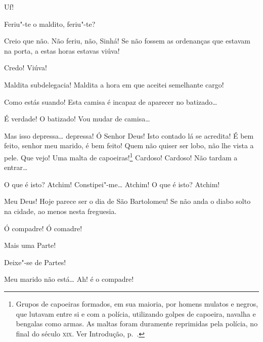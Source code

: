 \begin{linenumbers}
  Uf!

  Feriu"-te o maldito, feriu"-te?

 Creio que não.  Não feriu, não, Sinhá!
Se não fossem as ordenanças que estavam na
porta, a estas horas estavas viúva!

 Credo! Viúva!

 Maldita subdelegacia! Maldita a hora em que aceitei semelhante
cargo!

 Como estás suando! Esta camisa é incapaz de aparecer no
batizado\ldots{}

 É verdade! O batizado! Vou mudar de camisa\ldots{}

 Mas isso depressa\ldots{} depressa!  Ó Senhor Deus! Isto contado lá se acredita!
É bem feito, senhor meu marido, é bem feito! Quem não quiser ser
lobo, não lhe vista a pele.  Que vejo! Uma
malta de capoeiras!\footnote{ Grupos de capoeiras formados, em sua maioria, por homens
mulatos e negros, que lutavam entre si e com a polícia, utilizando golpes de
capoeira, navalha e bengalas como armas. As maltas foram duramente reprimidas
pela polícia, no final do século \textsc{xix}. Ver Introdução, p.~\pageref{capoeira}.} Cardoso! Cardoso! Não
tardam a entrar\ldots{}

  
O que é isto?  Atchim!
Constipei"-me\ldots{} Atchim! O que é isto? Atchim! 




 Meu Deus! Hoje parece ser o dia de São Bartolomeu! Se não anda
o diabo solto na cidade, ao menos
nesta freguesia.

 
Ó compadre! Ó comadre!

 Mais uma Parte!

 Deixe"-se de Partes!

 Meu marido não está\ldots{}  Ah! é o compadre!


\end{linenumbers}
